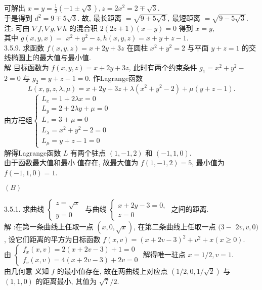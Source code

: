 \documentclass[a4paper,11pt,UTF8]{article}
\begin{document}
  可解出 $x=y=\frac{1}{2}(-1 \pm \sqrt{3}), z=2 x^2=2 \mp \sqrt{3}$. \\
 于是得到 $d^2=9 \mp 5 \sqrt{3}$. 故, 最长距离 $=\sqrt{9+5 \sqrt{3}}$, 最短距离 $=\sqrt{9-5 \sqrt{3}}$.\\
注: 可由 $\nabla f, \nabla g, \nabla h$ 的混合积 $2(2 z+1)(x-y)=0$ 得到 $x=y$, \\
其中 $g(x, y, x)=$ $x^2+y^2-z, h(x, y, z)=x+y+z-1$.\\
3.5.9. 求函数 $f(x, y, z)=x+2 y+3 z$ 在圆柱 $x^2+y^2=2$ 与平面 $y+z=1$ 的交 线椭圆上的最大值与最小值.\\
解 目标函数为 $f(x, y, z)=x+2 y+3 z$, 此时有两个约束条件 $g_1=x^2+y^2-$ $2=0$ 与 $g_2=y+z-1=0$. 作Lagrange函数
$$
L(x, y, z, \lambda, \mu)=x+2 y+3 z+\lambda\left(x^2+y^2-2\right)+\mu(y+z-1) .
$$
$
\text{由方程组}\left\{\begin{array}{l}
	L_x=1+2 \lambda x=0 \\
	L_y=2+2 \lambda y+\mu=0 \\
	L_z=3+\mu=0 \\
	L_\lambda=x^2+y^2-2=0 \\
	L_\mu=y+z-1=0
\end{array}\right.
$\\
解得Lagrange函数 $L$ 有两个驻点 $(1,-1,2)$ 和 $(-1,1,0)$.\\
 由于函数最大值和最小 值存在, 故最大值为 $f(1,-1,2)=5$, 最小值为 $f(-1,1,0)=1$.\\
\centerline{$(B)$}
3.5.1. 求曲线 $\left\{\begin{array}{l}z=\sqrt{x} \\ y=0\end{array}\right.$ 与曲线 $\left\{\begin{array}{l}x+2 y-3=0, \\ z=0\end{array}\right.$ 之间的距离.\\
解 :在第一条曲线上任取一点 $(x, 0, \sqrt{x})$, 在第二条曲线上任取一点 $(3-$ $2 v, v, 0)$, 设它们距离的平方为日标函数 $f(x, v)=(x+2 v-3)^2+v^2+x(x \geq 0)$.\\
 由 $\left\{\begin{array}{l}f_x(x, v)=2(x+2 v-3)+1=0 \\ f_v(x, v)=4(x+2 v-3)+2 v=0\end{array}\right.$
  解得唯一驻点 $x=1 / 2, v=1$. \\
  由几何意 义知 $f$ 的最小值存在, 故在两曲线上对应点 $(1 / 2,0,1 / \sqrt{2})$ 与 $(1,1,0)$ 的距离最小, 其值为 $\sqrt{7} / 2$.\\
\end{document}
